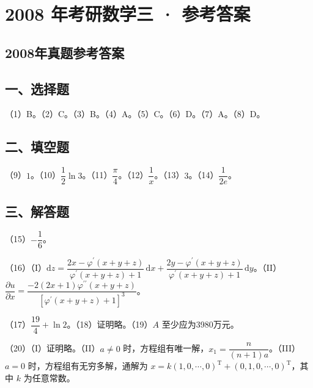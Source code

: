 \documentclass[UTF8,12pt]{ctexart}
\begin{document}
\section*{2008 年考研数学三 · 参考答案}
\subsection*{2008年真题参考答案}

\subsection*{一、选择题}

（1）B。（2）C。（3）B。（4）A。（5）C。（6）D。（7）A。（8）D。


\subsection*{二、填空题}

（9）\(\displaystyle 1\)。（10）\(\displaystyle \dfrac{\displaystyle 1}{\displaystyle 2}\ln3\)。（11）\(\displaystyle \dfrac{\displaystyle \pi}{\displaystyle 4}\)。（12）\(\displaystyle \dfrac{\displaystyle 1}{\displaystyle x}\)。（13）\(\displaystyle 3\)。（14）\(\displaystyle \dfrac{\displaystyle 1}{\displaystyle 2e}\)。


\subsection*{三、解答题}

（15）\(\displaystyle -\dfrac{\displaystyle 1}{\displaystyle 6}\)。


（16）（I）\(\displaystyle \mathrm dz=\dfrac{\displaystyle 2x-\varphi^{\prime}(x+y+z)}{\displaystyle \varphi^{\prime}(x+y+z)+1}\,\mathrm dx+\dfrac{\displaystyle 2y-\varphi^{\prime}(x+y+z)}{\displaystyle \varphi^{\prime}(x+y+z)+1}\,\mathrm dy\)。（II）\(\displaystyle \dfrac{\displaystyle \partial u}{\displaystyle \partial x}=\dfrac{\displaystyle -2(2x+1)\varphi^{\prime\prime}(x+y+z)}{\displaystyle [\varphi^{\prime}(x+y+z)+1]^3}\)。


（17）\(\displaystyle \dfrac{\displaystyle 19}{\displaystyle 4}+\ln2\)。（18）证明略。（19）\(\displaystyle A\) 至少应为3980万元。


（20）（I）证明略。（II）\(\displaystyle a\ne0\) 时，方程组有唯一解，\(\displaystyle x_1=\dfrac{\displaystyle n}{\displaystyle (n+1)a}\)。（III）\(\displaystyle a=0\) 时，方程组有无穷多解，通解为 \(\displaystyle x=k(1,\allowbreak 0,\allowbreak \cdots,\allowbreak 0)^{\mathrm T}+(0,\allowbreak 1,\allowbreak 0,\allowbreak \cdots,\allowbreak 0)^{\mathrm T}\)，其中 \(\displaystyle k\) 为任意常数。
\end{document}

